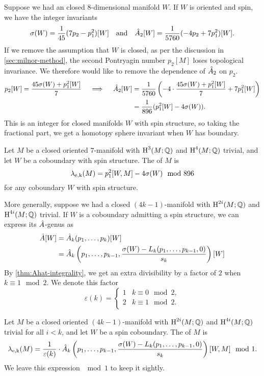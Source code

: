 Suppose we had an closed $8$-dimensional manifold $W$. If $W$ is oriented and spin, we have the integer invariants
\[
	\sigma(W) = \frac{1}{45}(7p_2- p_1^2)[W]\quad\textrm{and}\quad\hat{A}_2[W] = \frac{1}{5760}(-4p_2 + 7p_1^2)[W].
\]
If we remove the assumption that $W$ is closed, as per the discussion in \cref{sec:milnor-method}, the second Pontryagin number $p_2[M]$ loses topological invariance. We therefore would like to remove the dependence of $\hat{A}_2$ on $p_2$. 
\[
\begin{aligned}
	p_2[W] = \frac{45\sigma(W) +p_1^2[W]}{7}\quad\implies\quad 
	\hat{A}_2[W] &= \frac{1}{5760}\left(-4\cdot \frac{45\sigma(W) + p_1^2[W]}{7} + 7p_1^2[W]\right)\\
						 &=\frac{1}{896}(p_1^2[W]-4\sigma(W)).
\end{aligned}
\]
This is an integer for closed manifolds $W$ with spin structure, so taking the fractional part, we get a homotopy sphere invariant when $W$ has boundary.

\begin{definition}\label{def:eells-kupier-7-dimension}
	Let $M$ be a closed oriented $7$-manifold with $\operatorname{H}^3(M;\mathbb{Q})$ and $\operatorname{H}^4(M;\mathbb{Q})$ trivial, and let $W$ be a coboundary with spin structure. The  of $M$ is
	\[
		\lambda_{\mathrm{e,k}}(M) = p_1^2[W, M]-4\sigma(W)\mod 896
	\]
	for any coboundary $W$ with spin structure.
\end{definition}

More generally, suppose we had a closed $(4k-1)$-manifold with $\operatorname{H}^{2i}(M;\mathbb{Q})$ and $\operatorname{H}^{4i}(M;\mathbb{Q})$ trivial. If $W$ is a coboundary admitting a spin structure, we can express its $\hat{A}$-genus as
\[
	\begin{aligned}
	\hat{A}[W]&=\hat{A}_k(p_1,\ldots, p_k)[W]\\
					&= \hat{A}_k\left(p_1, \ldots, p_{k-1}, \frac{\sigma(W)-L_k(p_1,\ldots, p_{k-1},0)}{s_k}\right)[W]
	\end{aligned}
\]
By \cref{thm:Ahat-integrality}, we get an extra divisibility by a factor of $2$ when $k\equiv 1\mod 2$. We denote this factor 
\[
	\varepsilon(k) = 
	\begin{cases}
		1 & k\equiv 0 \mod 2,\\
		2 & k\equiv 1 \mod 2.\\
	\end{cases}
\] 

\begin{definition}
	Let $M$ be a closed oriented $(4k-1)$-manifold with $\operatorname{H}^{2i}(M;\mathbb{Q})$ and $\operatorname{H}^{4i}(M;\mathbb{Q})$ trivial for all $i<k$, and let $W$ be a spin coboundary. The  of $M$ is
	\[
		\lambda_{\mathrm{e,k}}(M) = \frac{1}{\varepsilon(k)}\cdot \hat{A}_k\left(p_1, \ldots, p_{k-1}, \frac{\sigma(W)-L_k(p_1,\ldots, p_{k-1},0)}{s_k}\right)[W,M]\mod 1.
	\]
	We leave this expression $\mod 1$ to keep it sightly.
\end{definition}

